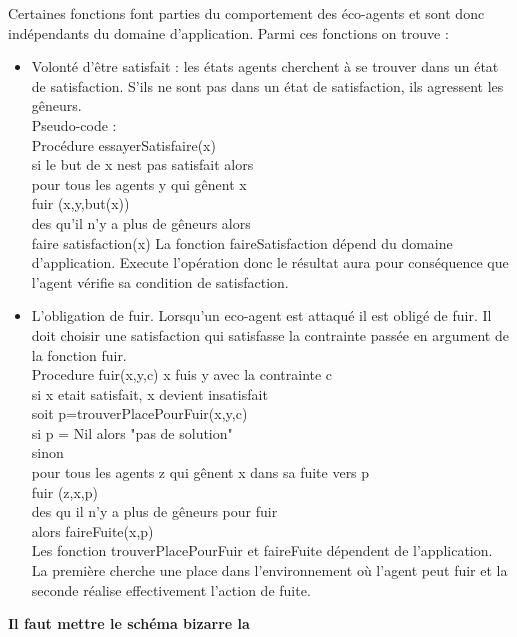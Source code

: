 		Certaines fonctions font parties du comportement des éco-agents et sont donc indépendants du domaine d'application. Parmi ces fonctions on trouve : 
		\begin{itemize}
		\item  Volonté d'être satisfait : les états agents cherchent à se trouver dans un état de satisfaction. S'ils ne sont pas dans un état de satisfaction, ils agressent les gêneurs. \\
		Pseudo-code : \\
		Procédure essayerSatisfaire(x) \\
		si le but de x nest pas satisfait alors \\
		pour tous les agents y qui gênent x \\
		fuir (x,y,but(x))\\
		des qu'il n'y a plus de gêneurs alors \\
		faire satisfaction(x)
		La fonction faireSatisfaction dépend du domaine d'application. Execute l'opération donc le résultat aura pour conséquence que l'agent vérifie sa condition de satisfaction. 
		\item L'obligation de fuir. Lorsqu'un eco-agent est attaqué il est obligé de fuir. Il doit choisir une satisfaction qui satisfasse la contrainte passée en argument de la fonction fuir. \\
		Procedure fuir(x,y,c)    x fuis y avec la contrainte c \\
		si x etait satisfait, x devient insatisfait \\
		soit p=trouverPlacePourFuir(x,y,c) \\
		si p = Nil alors "pas de solution" \\
		sinon \\
			pour tous les agents z qui gênent x dans sa fuite vers p \\
			fuir (z,x,p) \\
			des qu il n'y a plus de gêneurs pour fuir\\
			alors faireFuite(x,p) \\
		Les fonction trouverPlacePourFuir et faireFuite dépendent de l'application. La première cherche une place dans l'environnement où l'agent peut fuir et la seconde réalise effectivement l'action de fuite. 	
		\end{itemize}
		
		\textbf{Il faut mettre le schéma bizarre la }
